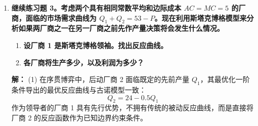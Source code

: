 \begin{enumerate}[label=\textbf{\arabic*.}, leftmargin=*]
		(4) 联立两厂商的反应曲线方程，解得古诺均衡产量为 $Q_1 = Q_2 = 16$。此时市场总产量为 32，均衡价格为 $P = 53 - 32 = 21$。各厂商的非合作均衡利润为：
		\[ \pi_1 = \pi_2 = (21 - 5) \times 16 = 256 \]
		
		(5) 当存在 $N$ 家代表性厂商时，市场价格方程扩展为 $P = 53 - \sum_{j=1}^N Q_j$。第 $i$ 家厂商的利润最大化条件为：
		\[
		\begin{aligned}
			\frac{\partial\pi_i}{\partial Q_i} = 53 - 2Q_i - \sum_{j \neq i} Q_j - 5 = 0
		\end{aligned}
		\]
		基于对称性假定，所有厂商的均衡产量均相等，即 $Q_i = Q^*$。上式可转化为：
		\[
		\begin{aligned}
			48 - 2Q^* - (N - 1)Q^* = 0 \implies Q^* = \frac{48}{N + 1}
		\end{aligned}
		\]
		由此可知，市场总产出为 $\frac{48N}{N + 1}$，代入反需求函数得到市场均衡价格为：
		\[ P = 53 - \frac{48N}{N + 1} = 5 + \frac{48}{N + 1} \]
		单家厂商的均衡利润为：
		\[ \pi_i = (P - MC)Q^* = \left(\frac{48}{N + 1}\right)^2 = \frac{2304}{(N + 1)^2} \]
		显然，当厂商数量趋于无穷时：
		\[
		\begin{aligned}
			\lim_{N \to \infty} P &= \lim_{N \to \infty} \left(5 + \frac{48}{N + 1}\right) = 5 \\
			\lim_{N \to \infty} \pi_i &= 0
		\end{aligned}
		\]
		此时市场价格恰好等于边际成本，超额利润完全消失，证明古诺市场结构在长期趋近于完全竞争均衡。
		
		\item \textbf{继续练习题 3。考虑两个具有相同常数平均和边际成本 $AC = MC = 5$ 的厂商，面临的市场需求曲线为 $Q_1 + Q_2 = 53 - P$。现在利用斯塔克博格模型来分析如果两厂商之一在另一厂商之前先作产量决策将会发生什么情况。}
		
		\begin{enumerate}
			\item \textbf{设厂商 1 是斯塔克博格领袖。找出反应曲线。}
			\item \textbf{各厂商将生产多少，以及利润为多少？}
		\end{enumerate}
		
		\textbf{解：}
		(1) 在序贯博弈中，后动厂商 2 面临既定的先前产量 $Q_1$，其最优化一阶条件导出的最优反应曲线与古诺模型一致：
		\[ Q_2 = 24 - 0.5Q_1 \]
		作为领导者的厂商 1 具有先行优势，不拥有传统的被动反应曲线，而是直接将厂商 2 的反应函数作为已知边界约束条件。
		

\end{enumerate}
